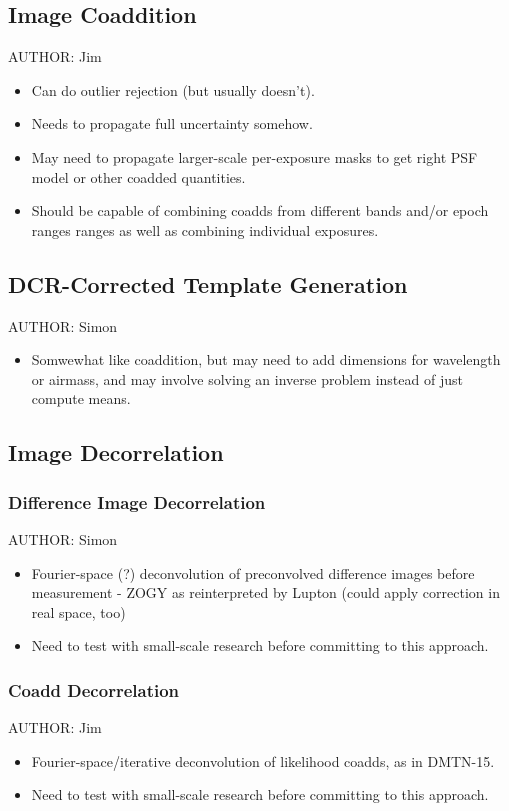 \subsection{Image Coaddition}
AUTHOR: Jim
\begin{itemize}
\item Can do outlier rejection (but usually doesn't).
\item Needs to propagate full uncertainty somehow.
\item May need to propagate larger-scale per-exposure masks to get right PSF model or other coadded quantities.
\item Should be capable of combining coadds from different bands and/or epoch ranges ranges as well as combining individual exposures.
\end{itemize}

\subsection{DCR-Corrected Template Generation}
AUTHOR: Simon
\begin{itemize}
\item Somwewhat like coaddition, but may need to add dimensions for wavelength or airmass, and may involve solving an inverse problem instead of just compute means.
\end{itemize}

\subsection{Image Decorrelation}
\subsubsection{Difference Image Decorrelation}
AUTHOR: Simon
\begin{itemize}
\item Fourier-space (?) deconvolution of preconvolved difference images before measurement - ZOGY as reinterpreted by Lupton (could apply correction in real space, too)
\item Need to test with small-scale research before committing to this approach.
\end{itemize}

\subsubsection{Coadd Decorrelation}
AUTHOR: Jim
\begin{itemize}
\item Fourier-space/iterative deconvolution of likelihood coadds, as in DMTN-15.
\item Need to test with small-scale research before committing to this approach.
\end{itemize}

